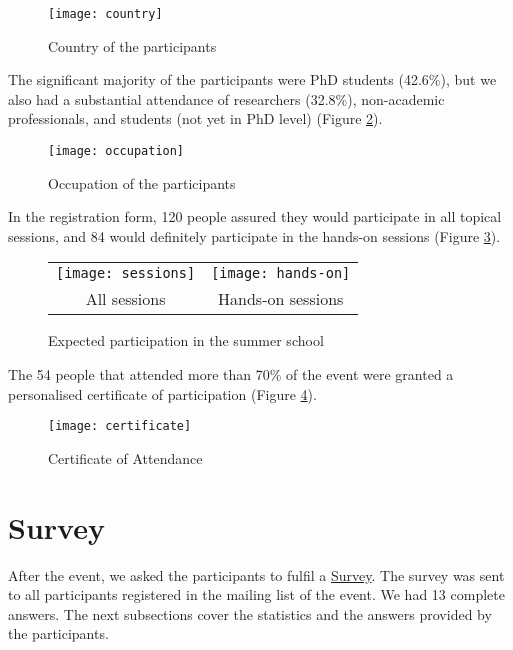 \begin{figure}[H]
\centering
\texttt{[image: country]}
\caption{\label{fig:country} Country of the participants}
\end{figure}

The significant majority of the participants were PhD students (42.6\%), but we also had a substantial attendance of researchers (32.8\%), non-academic professionals, and students (not yet in PhD level) (Figure \ref{fig:occupation}).

\begin{figure}[H]
\centering
\texttt{[image: occupation]}
\caption{\label{fig:occupation} Occupation of the participants}
\end{figure}

In the registration form, 120 people assured they would participate in all topical sessions, and 84 would definitely participate in the hands-on sessions (Figure \ref{fig:part}).

\begin{figure}[H]
\centering
\begin{tabular}{cc}
\texttt{[image: sessions]} &
\texttt{[image: hands-on]} \\
\hspace{-3cm} All sessions &
Hands-on sessions
\end{tabular}
\caption{\label{fig:part} Expected participation in the summer school}
\end{figure}


The 54 people that attended more than 70\% of the event were granted a personalised certificate of participation (Figure \ref{fig:cert}).

\begin{figure}[H]
\centering
\texttt{[image: certificate]}
\caption{\label{fig:cert} Certificate of Attendance}
\end{figure}

\section{Survey}

After the event, we asked the participants to fulfil a \href{https://docs.google.com/forms/d/1UMMUGfos13HmsvMO6WFBrDXQkNIhOxoLooBBgoSde-I}{Survey}. The survey was sent to all participants registered in the mailing list of the event. We had 13 complete answers. The next subsections cover the statistics and the answers provided by the participants.

